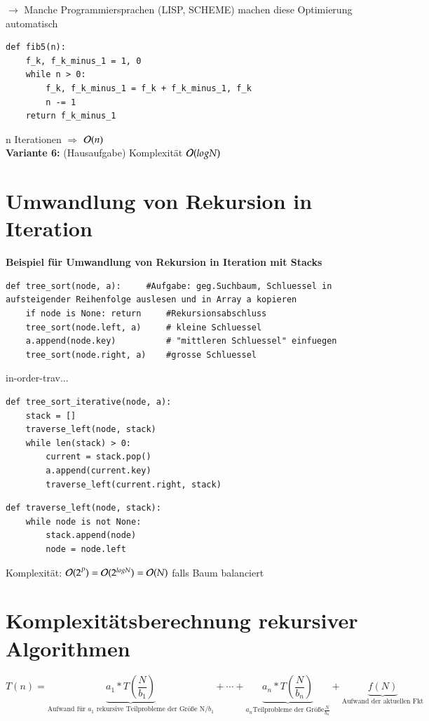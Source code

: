 $\rightarrow$ Manche Programmiersprachen (LISP, SCHEME) machen diese Optimierung automatisch\\

\begin{verbatim}
def fib5(n):
    f_k, f_k_minus_1 = 1, 0
    while n > 0:
        f_k, f_k_minus_1 = f_k + f_k_minus_1, f_k
        n -= 1
    return f_k_minus_1
\end{verbatim}
n Iterationen $\Rightarrow$ $\mathcal{O}{}(n)$\\

\textbf{Variante 6:} (Hausaufgabe) Komplexität $\mathcal{O}{}(log N)$ \\

\section{Umwandlung von Rekursion in Iteration}
\textbf{Beispiel für Umwandlung von Rekursion in Iteration mit Stacks}
\begin{verbatim}
def tree_sort(node, a):     #Aufgabe: geg.Suchbaum, Schluessel in aufsteigender Reihenfolge auslesen und in Array a kopieren
    if node is None: return     #Rekursionsabschluss
    tree_sort(node.left, a)     # kleine Schluessel
    a.append(node.key)          # "mittleren Schluessel" einfuegen
    tree_sort(node.right, a)    #grosse Schluessel
\end{verbatim}
in-order-trav...

\begin{verbatim}
def tree_sort_iterative(node, a):
    stack = []
    traverse_left(node, stack)
    while len(stack) > 0:
        current = stack.pop()
        a.append(current.key)
        traverse_left(current.right, stack)
\end{verbatim}
\begin{verbatim}
def traverse_left(node, stack):
    while node is not None:
        stack.append(node)
        node = node.left
\end{verbatim}

Komplexität: $\mathcal{O}{}(2^P) = \mathcal{O}{}(2^{log N}) = \mathcal{O}{}(N)$ falls Baum balanciert \\

\section{Komplexitätsberechnung rekursiver Algorithmen}
\[ T(n) = \underbrace{a_1 * T\left(\frac{N}{b_1}\right)}_{\text{Aufwand für $a_1$ rekursive Teilprobleme der Größe N/$b_1$}} + \cdots + \underbrace{a_n* T\left(\frac{N}{b_n}\right)}_{a_n \text{Teilprobleme der Größe} \frac{N}{b_n}} + \underbrace{f(N)}_{\text{Aufwand der aktuellen Fkt}}\]

